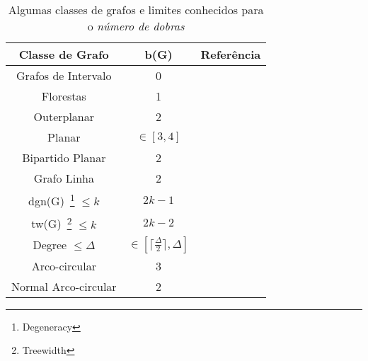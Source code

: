 \begin{table}[h]
\caption{Algumas classes de grafos e limites conhecidos para o \textit{número de dobras}}
\label{tab:limitesBenNumber}
\begin{center}
\begin{tabular}{|c|c|c|}
\hline 
Classe de Grafo & b(G) & Referência \\ 
\hline \hline  
Grafos de Intervalo & 0 & \cite{golumbic2009} \\ 
\hline 
Florestas & 1 & \cite{golumbic2009} \\ 
\hline 
Outerplanar &  2 & \cite{daniel2014b} \\ 
\hline 
Planar & $\in [3, 4]$ & \cite{daniel2014b}\\ 
\hline  
Bipartido Planar & 2 & \cite{biedl2010} \\ 
\hline 
Grafo Linha & 2 & \cite{biedl2010} \\ 
\hline 
dgn(G)~\footnote{Degeneracy} $\leq k$ & $2k-1$ & \cite{daniel2014b} \\ 
\hline 
tw(G)~\footnote{Treewidth} $\leq k$ & $2k-2$ & \cite{daniel2014b} \\ 
\hline 
Degree $\leq \Delta$ & $ \in [	\lceil \frac{\Delta}{2}\rceil, \Delta ] $ & \cite{daniel2014b} \\ 
\hline 
Arco-circular & 3 & \cite{alcon2016} \\ 
\hline 
Normal Arco-circular & 2 & \cite{alcon2016} \\ \hline 
\end{tabular} 
\end{center}
\end{table}